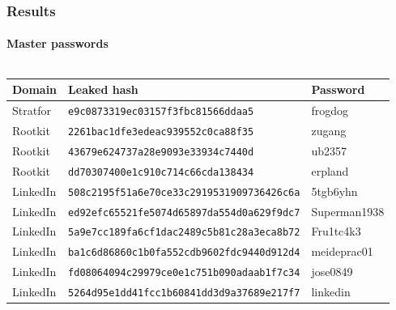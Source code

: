 \documentclass[handout, notes=hide]{beamer}
\begin{document}

\begin{frame}
\frametitle{Results}
\framesubtitle{Master passwords}
\setlength{\parskip}{0.5em}

\begin{columns}[T]
\begin{column}[T]{1.0\textwidth}
\setlength{\parskip}{0.5em}

\fontsize{8pt}{15}\selectfont

\begin{tabular}{p{1.8cm}|p{6cm}|p{1.8cm}}
	{\bf Domain} & {\bf Leaked hash} & {\bf Password} \\ \hline
	Stratfor & {\tt e9c0873319ec03157f3fbc81566ddaa5} & frogdog \\
	Rootkit & {\tt 2261bac1dfe3edeac939552c0ca88f35} & zugang \\
	Rootkit & {\tt 43679e624737a28e9093e33934c7440d} & ub2357 \\
	Rootkit & {\tt dd70307400e1c910c714c66cda138434} & erpland \\
	LinkedIn & {\tt 508c2195f51a6e70ce33c2919531909736426c6a} & 5tgb6yhn \\
	LinkedIn & {\tt ed92efc65521fe5074d65897da554d0a629f9dc7} & Superman1938 \\
	LinkedIn & {\tt 5a9e7cc189fa6cf1dac2489c5b81c28a3eca8b72} & Fru1tc4k3 \\
	LinkedIn & {\tt ba1c6d86860c1b0fa552cdb9602fdc9440d912d4} & meideprac01 \\
	LinkedIn & {\tt fd08064094c29979ce0e1c751b090adaab1f7c34} & jose0849 \\
	LinkedIn & {\tt 5264d95e1dd41fcc1b60841dd3d9a37689e217f7} & linkedin
\end{tabular}

\end{column}
\end{columns}


\end{frame}

\end{document}
